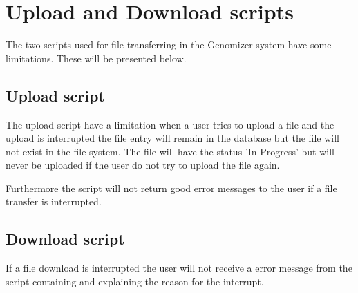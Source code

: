 \section{Upload and Download scripts}
The two scripts used for file transferring in the Genomizer system have some limitations. These will be presented below.
\subsection{Upload script}
The upload script have a limitation when a user tries to upload a file and the upload is interrupted the file entry will remain in the database but the file will not exist in the file system. The file will have the status 'In Progress' but will never be uploaded if the user do not try to upload the file again.

Furthermore the script will not return good error messages to the user if a file transfer is interrupted. 
\subsection{Download script}
If a file download is interrupted the user will not receive a error message from the script containing and explaining the reason for the interrupt. 

